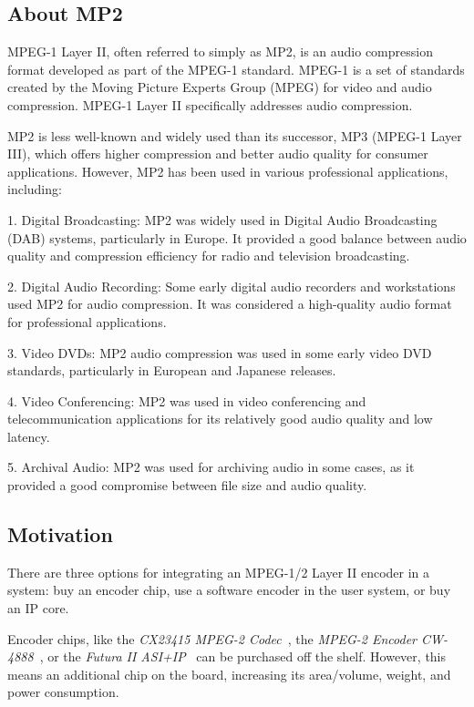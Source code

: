 \subsection{About MP2}



MPEG-1 Layer II, often referred to simply as MP2, is an audio compression format developed as part of the MPEG-1 standard. MPEG-1 is a set of standards created by the Moving Picture Experts Group (MPEG) for video and audio compression. MPEG-1 Layer II specifically addresses audio compression.

MP2 is less well-known and widely used than its successor, MP3 (MPEG-1 Layer III), which offers higher compression and better audio quality for consumer applications. However, MP2 has been used in various professional applications, including:

1. Digital Broadcasting: MP2 was widely used in Digital Audio Broadcasting (DAB) systems, particularly in Europe. It provided a good balance between audio quality and compression efficiency for radio and television broadcasting.

2. Digital Audio Recording: Some early digital audio recorders and workstations used MP2 for audio compression. It was considered a high-quality audio format for professional applications.

3. Video DVDs: MP2 audio compression was used in some early video DVD standards, particularly in European and Japanese releases.

4. Video Conferencing: MP2 was used in video conferencing and telecommunication applications for its relatively good audio quality and low latency.

5. Archival Audio: MP2 was used for archiving audio in some cases, as it provided a good compromise between file size and audio quality.



\subsection{Motivation}

There are three options for integrating an MPEG-1/2 Layer II encoder in a system: buy an encoder chip, use a software encoder in the user system, or buy an IP core.

Encoder chips, like the \textit{CX23415 MPEG-2 Codec}~\cite{cx23415}, the \textit{MPEG-2 Encoder CW-4888}~\cite{cw4888}, or the \textit{Futura II ASI+IP}~\cite{futura} can be purchased off the shelf. However, this means an additional chip on the board, increasing its area/volume, weight, and power consumption.

